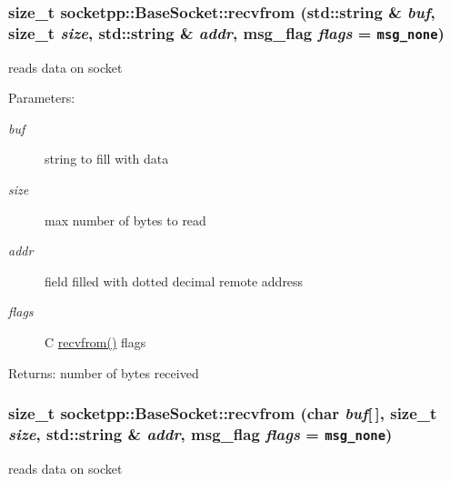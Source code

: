 \begin{CompactItemize}
{\subsubsection[{recvfrom}]{\setlength{\rightskip}{0pt plus 5cm}size\_\-t socketpp::BaseSocket::recvfrom (std::string \& {\em buf}, \/  size\_\-t {\em size}, \/  std::string \& {\em addr}, \/  msg\_\-flag {\em flags} = {\tt msg\_\-none})}}
\label{classsocketpp_1_1BaseSocket_8ba6376183fbcce5266775ecc1749e0a}


reads data on socket 

\begin{Desc}
\item[Parameters:]
\begin{description}
\item[{\em buf}]string to fill with data \item[{\em size}]max number of bytes to read \item[{\em addr}]field filled with dotted decimal remote address \item[{\em flags}]C \hyperlink{classsocketpp_1_1BaseSocket_6a207860c0a1328dc05bea32bb62e81f}{recvfrom()} flags \end{description}
\end{Desc}
\begin{Desc}
\item[Returns:]number of bytes received \end{Desc}
\hypertarget{classsocketpp_1_1BaseSocket_5ee0ad55fa03ca79a879e1d73670ede9}{
\subsubsection[{recvfrom}]{\setlength{\rightskip}{0pt plus 5cm}size\_\-t socketpp::BaseSocket::recvfrom (char {\em buf}\mbox{[}$\,$\mbox{]}, \/  size\_\-t {\em size}, \/  std::string \& {\em addr}, \/  msg\_\-flag {\em flags} = {\tt msg\_\-none})}}
\label{classsocketpp_1_1BaseSocket_5ee0ad55fa03ca79a879e1d73670ede9}


reads data on socket 


\end{CompactItemize}
